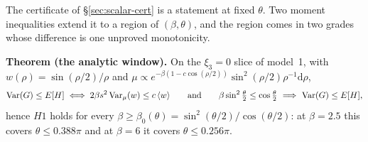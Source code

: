The certificate of \S\ref{sec:scalar-cert} is a statement at fixed $\theta$. Two moment inequalities
extend it to a region of $(\beta,\theta)$, and the region comes in two grades whose difference is one
unproved monotonicity.

\begin{keybox}
\textbf{Theorem (the analytic window).} On the $\xi_{3}=0$ slice of model~1, with
$w(\rho)=\sin(\rho/2)/\rho$ and $\mu\propto e^{-\beta(1-c\cos(\rho/2))}\sin^{2}(\rho/2)\rho^{-1}
\mathrm{d}\rho$,
\[
\Var(G)\le E[H]\iff 2\beta s^{2}\Var_{\mu}(w)\le c\,\langle w\rangle
\qquad\text{and}\qquad
\beta\sin^{2}\tfrac{\theta}{2}\le\cos\tfrac{\theta}{2}\ \Longrightarrow\ \Var(G)\le E[H],
\]
hence $H1$ holds for every $\beta\ge\beta_{0}(\theta)=\sin^{2}(\theta/2)/\cos(\theta/2)$: at
$\beta=2.5$ this covers $\theta\le0.388\pi$ and at $\beta=6$ it covers $\theta\le0.256\pi$. \LT
\end{keybox}


